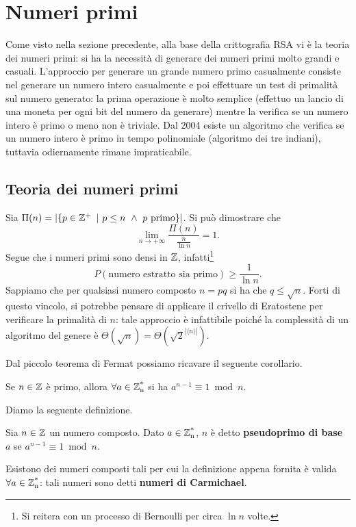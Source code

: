 \section{Numeri primi}
Come visto nella sezione precedente, alla base della crittografia RSA vi è la teoria dei numeri primi: si ha la necessità di generare dei numeri primi molto grandi e casuali. L'approccio per generare un grande numero primo casualmente consiste nel generare un numero intero casualmente e poi effettuare un test di primalità sul numero generato: la prima operazione è molto semplice (effettuo un lancio di una moneta per ogni bit del numero da generare) mentre la verifica se un numero intero è primo o meno non è triviale. Dal 2004 esiste un algoritmo che verifica se un numero intero è primo in tempo polinomiale (algoritmo dei tre indiani), tuttavia odiernamente rimane impraticabile. 

\subsection{Teoria dei numeri primi}
Sia $\Pi(n)=|\{p\in\Zp\ |\ p\leq n\ \land\ p\ \text{primo}\}|$. Si può dimostrare che
\[
\lim_{n \to +\infty} \frac{\Pi(n)}{\frac{n}{\ln n}} = 1.
\]
Segue che i numeri primi sono densi in $\operatorname*{\mathbb{Z}}$, infatti\footnote{Si reitera con un processo di Bernoulli per circa $\ln n$ volte.}
\[
P(\text{numero estratto sia primo})\geq \frac{1}{\ln n}.
\]
Sappiamo che per qualsiasi numero composto $n=pq$ si ha che $q\leq\sqrt{n}$. Forti di questo vincolo, si potrebbe pensare di applicare il crivello di Eratostene per verificare la primalità di $n$: tale approccio è infattibile poiché la complessità di un algoritmo del genere è $\Theta(\sqrt{n})=\Theta({\sqrt{2}}^{|\langle n \rangle|})$.

Dal piccolo teorema di Fermat possiamo ricavare il seguente corollario.
\begin{corollario}
Se $n\in\operatorname*{\mathbb{Z}}$ è primo, allora $\forall a\in\operatorname*{\mathbb{Z}_n^*}$ si ha $a^{n-1} \equiv 1\bmod n$.
\end{corollario}

Diamo la seguente definizione.
\begin{definizione}
Sia $n\in\operatorname*{\mathbb{Z}}$ un numero composto. Dato $a\in\operatorname*{\mathbb{Z}_n^*}$, $n$ è detto \textbf{pseudoprimo di base} $a$ se $a^{n-1} \equiv 1\bmod n$.
\end{definizione}

Esistono dei numeri composti tali per cui la definizione appena fornita è valida $\forall a\in\operatorname*{\mathbb{Z}_n^*}$: tali numeri sono detti \textbf{numeri di Carmichael}. 

